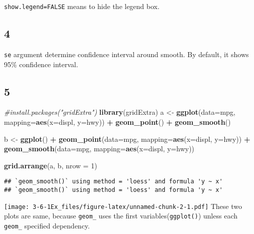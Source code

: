 \documentclass[]{article}
\newenvironment{Shaded}{\begin{snugshade}}{\end{snugshade}}
\newcommand{\CommentTok}[1]{\textcolor[rgb]{0.56,0.35,0.01}{\textit{#1}}}
\newcommand{\DataTypeTok}[1]{\textcolor[rgb]{0.13,0.29,0.53}{#1}}
\newcommand{\DecValTok}[1]{\textcolor[rgb]{0.00,0.00,0.81}{#1}}
\newcommand{\KeywordTok}[1]{\textcolor[rgb]{0.13,0.29,0.53}{\textbf{#1}}}
\newcommand{\NormalTok}[1]{#1}
\newcommand{\OperatorTok}[1]{\textcolor[rgb]{0.81,0.36,0.00}{\textbf{#1}}}
\newcommand{\StringTok}[1]{\textcolor[rgb]{0.31,0.60,0.02}{#1}}
\begin{document}
\texttt{show.legend=FALSE} means to hide the legend box.

\hypertarget{section-4}{%
\subsection{4}\label{section-4}}

\texttt{se} argument determine confidence interval around smooth. By
default, it shows 95\% confidence interval.

\hypertarget{section-5}{%
\subsection{5}\label{section-5}}

\begin{Shaded}
\begin{Highlighting}[]
\CommentTok{#install.packages("gridExtra")}
\KeywordTok{library}\NormalTok{(gridExtra)}
\NormalTok{a <-}\StringTok{ }\KeywordTok{ggplot}\NormalTok{(}\DataTypeTok{data=}\NormalTok{mpg, }\DataTypeTok{mapping=}\KeywordTok{aes}\NormalTok{(}\DataTypeTok{x=}\NormalTok{displ, }\DataTypeTok{y=}\NormalTok{hwy)) }\OperatorTok{+}\StringTok{ }
\StringTok{  }\KeywordTok{geom_point}\NormalTok{() }\OperatorTok{+}\StringTok{ }
\StringTok{  }\KeywordTok{geom_smooth}\NormalTok{()}

\NormalTok{b <-}\StringTok{ }\KeywordTok{ggplot}\NormalTok{() }\OperatorTok{+}\StringTok{ }
\StringTok{  }\KeywordTok{geom_point}\NormalTok{(}\DataTypeTok{data=}\NormalTok{mpg, }\DataTypeTok{mapping=}\KeywordTok{aes}\NormalTok{(}\DataTypeTok{x=}\NormalTok{displ, }\DataTypeTok{y=}\NormalTok{hwy)) }\OperatorTok{+}\StringTok{ }
\StringTok{  }\KeywordTok{geom_smooth}\NormalTok{(}\DataTypeTok{data=}\NormalTok{mpg, }\DataTypeTok{mapping=}\KeywordTok{aes}\NormalTok{(}\DataTypeTok{x=}\NormalTok{displ, }\DataTypeTok{y=}\NormalTok{hwy))}

\KeywordTok{grid.arrange}\NormalTok{(a, b, }\DataTypeTok{nrow =} \DecValTok{1}\NormalTok{)}
\end{Highlighting}
\end{Shaded}

\begin{verbatim}
## `geom_smooth()` using method = 'loess' and formula 'y ~ x'
## `geom_smooth()` using method = 'loess' and formula 'y ~ x'
\end{verbatim}

\texttt{[image: 3-6-1Ex\_files/figure-latex/unnamed-chunk-2-1.pdf]} These
two plots are same, because \texttt{geom\_} uses the first
variables(\texttt{ggplot()}) unless each \texttt{geom\_} specified
dependency.
\end{document}
